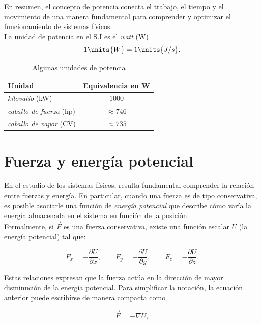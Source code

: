 En resumen, el concepto de potencia conecta el trabajo, el tiempo y el movimiento de una manera fundamental para comprender y optimizar el funcionamiento de sistemas físicos.\\[.35cm]


La unidad de potencia en el S.I es el \textit{watt} (W)
$$1\units{W}=1\units{J/s}. $$

\begin{table}[h!]
\caption{Algunas unidades de potencia}
\label{tab:W}
\centering
\begin{tabular}{lc}
\toprule
\textbf{Unidad}&\textbf{Equivalencia en W} \\[.35cm]
\toprule
\textit{kilovatio} (kW)& $1000$ \\[.35cm]
\textit{caballo de fuerza} (hp) & $\approx 746$ \\[.35cm]
\textit{caballo de vapor} (CV)& $\approx 735$\\[.35cm]
\toprule
\end{tabular}
\end{table}


\section{Fuerza y energía potencial}

En el estudio de los sistemas físicos, resulta fundamental comprender la relación entre fuerzas y energía. En particular, cuando una fuerza es de tipo conservativa, es posible asociarle una función de \textit{energía potencial} que describe cómo varía la energía almacenada en el sistema en función de la posición. \\[.35cm]

Formalmente, si $\vec{F}$ es una fuerza conservativa, existe una función escalar $U$ (la energía potencial) tal que:

\begin{equation}
F_{x} = -\frac{\partial U}{\partial x}, \qquad F_{y} = -\frac{\partial U}{\partial y}, \qquad F_{z} = -\frac{\partial U}{\partial z}.
\end{equation}

Estas relaciones expresan que la fuerza actúa en la dirección de mayor disminución de la energía potencial. Para simplificar la notación, la ecuación anterior puede escribirse de manera compacta como

\begin{equation}
\vec{F} = -\nabla U,
\end{equation}

